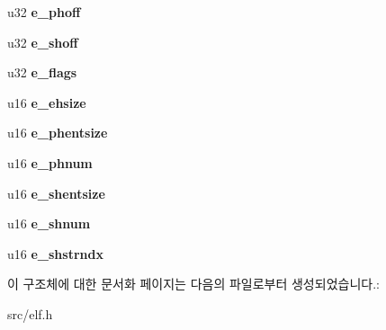 \begin{DoxyCompactItemize}
u32 {\bfseries e\+\_\+phoff}
\item 
\mbox{\label{struct_e_l_f_header_ac70240758bf6424ca5c806c65d39a63d}} 
u32 {\bfseries e\+\_\+shoff}
\item 
\mbox{\label{struct_e_l_f_header_abf8410fa68218cd420022ee70222e242}} 
u32 {\bfseries e\+\_\+flags}
\item 
\mbox{\label{struct_e_l_f_header_a5b0c2118b948227b82c61477348f5ce6}} 
u16 {\bfseries e\+\_\+ehsize}
\item 
\mbox{\label{struct_e_l_f_header_a54f6348c72b743df1298f14d9727ee63}} 
u16 {\bfseries e\+\_\+phentsize}
\item 
\mbox{\label{struct_e_l_f_header_a40ea098754df174746d084dd4ac1322d}} 
u16 {\bfseries e\+\_\+phnum}
\item 
\mbox{\label{struct_e_l_f_header_a6fea1910b959192096e6391950e55e12}} 
u16 {\bfseries e\+\_\+shentsize}
\item 
\mbox{\label{struct_e_l_f_header_a269f1c30e9f4a79074b4914243f83497}} 
u16 {\bfseries e\+\_\+shnum}
\item 
\mbox{\label{struct_e_l_f_header_a06d7be4a0c5eb3ffcf9e6adade39949c}} 
u16 {\bfseries e\+\_\+shstrndx}
\end{DoxyCompactItemize}


이 구조체에 대한 문서화 페이지는 다음의 파일로부터 생성되었습니다.\+:\begin{DoxyCompactItemize}
\item 
src/elf.\+h\end{DoxyCompactItemize}
